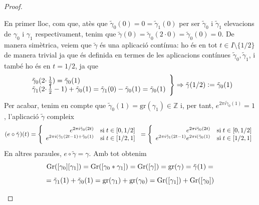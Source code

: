 \documentclass[../main.tex]{subfiles}
\begin{document}
\begin{proof}
\begin{itemize}
    En primer lloc, com que, atès que $\tilde{\gamma}_0(0) = 0 = \tilde{\gamma}_1(0)$ per ser $\tilde{\gamma}_0$ i $\tilde{\gamma}_1$ elevacions de $\gamma_0$ i $\gamma_1$ respectivament, tenim que $\tilde{\gamma}(0) = \tilde{\gamma}_0(2\cdotp 0) = \tilde{\gamma}_0(0) = 0$. De manera simètrica, veiem que $\tilde{\gamma}$ és una aplicació contínua: ho és en tot $t\in I\setminus\{1/2\}$ de manera trivial ja que és definida en termes de les aplicacions contínues $\tilde{\gamma}_0,\tilde{\gamma}_1$, i també ho és en $t = 1/2$, ja que
    \begin{equation}
        \notag
        \left.
        \begin{array}{ll}
            \tilde{\gamma}_0(2\cdotp\frac{1}{2}) = \tilde{\gamma}_0(1) \\
            \tilde{\gamma}_1(2\cdotp\frac{1}{2}-1)+\tilde{\gamma}_0(1) = \tilde{\gamma}_1(0)-\tilde{\gamma}_0(1) = \tilde{\gamma}_0(1)
        \end{array}
        \right\} \Rightarrow \tilde{\gamma}(1/2) := \tilde{\gamma}_0(1)
    \end{equation}
    Per acabar, tenim en compte que $\tilde{\gamma}_0(1) = \mathrm{gr}(\gamma_1)\in\mathbb{Z}$ i, per tant, $e^{2\pi i\tilde{\gamma}_0(1)}=1$, l'aplicació $\tilde{\gamma}$ compleix
    \begin{equation}
        \notag
        (e\circ\tilde{\gamma})(t) = \left\{
        \begin{array}{rl}
            e^{2\pi i\Tilde{\gamma}_0(2t)} & \mathrm{si}\;t\in[0,1/2] \\
            e^{2\pi i(\tilde{\gamma}_1(2t-1)+\tilde{\gamma}_0(1)} & \mathrm{si}\;t\in[1/2,1]
        \end{array}
        \right. = 
        \left\{
        \begin{array}{rl}
            e^{2\pi i\Tilde{\gamma}_0(2t)} & \mathrm{si}\;t\in[0,1/2] \\
            e^{2\pi i\tilde{\gamma}_1(2t-1)}e^{2\pi i(\tilde{\gamma}_0(1)} & \mathrm{si}\;t\in[1/2,1]
        \end{array}
        \right.
    \end{equation}
    En altres paraules, $e\circ\tilde{\gamma}=\gamma$. Amb tot obtenim
    \begin{equation}
        \notag
        \mathrm{Gr}([\gamma_0][\gamma_1]) = \mathrm{Gr}([\gamma_0*\gamma_1]) = \mathrm{Gr}([\gamma]) = \mathrm{gr}(\gamma) = \tilde{\gamma}(1) = 
    \end{equation}
    \begin{equation}
        \notag
        = \tilde{\gamma}_1(1)+\tilde{\gamma}_0(1) = \mathrm{gr}(\gamma_1)+\mathrm{gr}(\gamma_0) =\mathrm{Gr}([\gamma_1])+\mathrm{Gr}([\gamma_0])
    \end{equation}
    

\end{itemize}
\end{proof}
\end{document}
